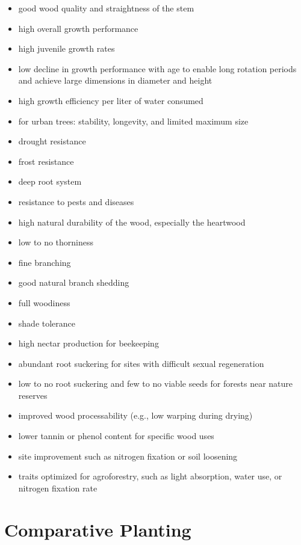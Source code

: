 \begin{itemize}
  \item good wood quality and straightness of the stem
  \item high overall growth performance
  \item high juvenile growth rates
  \item low decline in growth performance with age to enable long rotation periods and achieve large dimensions in diameter and height
  \item high growth efficiency per liter of water consumed
  \item for urban trees: stability, longevity, and limited maximum size
  \item drought resistance
  \item frost resistance
  \item deep root system
  \item resistance to pests and diseases
  \item high natural durability of the wood, especially the heartwood
  \item low to no thorniness
  \item fine branching
  \item good natural branch shedding
  \item full woodiness
  \item shade tolerance
  \item high nectar production for beekeeping
  \item abundant root suckering for sites with difficult sexual regeneration
  \item low to no root suckering and few to no viable seeds for forests near nature reserves
  \item improved wood processability (e.g., low warping during drying)
  \item lower tannin or phenol content for specific wood uses
  \item site improvement such as nitrogen fixation or soil loosening
  \item traits optimized for agroforestry, such as light absorption, water use, or nitrogen fixation rate
\end{itemize}

\section{Comparative Planting}

